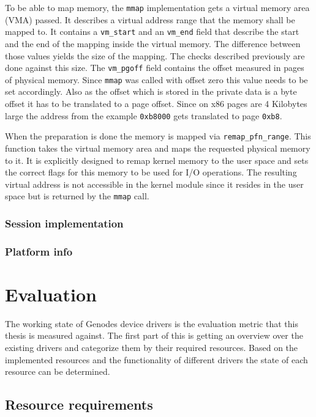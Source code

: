 \documentclass[
a4paper,
12pt,
notitlepage,
parskip=half,
DIV=11,
]{scrbook}
\begin{document}
		To be able to map memory, the \texttt{mmap} implementation gets a virtual memory area (VMA) passed.
		It describes a virtual address range that the memory shall be mapped to.
		It contains a \texttt{vm\_start} and an \texttt{vm\_end} field that describe the start and the end of the mapping inside the virtual memory.
		The difference between those values yields the size of the mapping.
		The checks described previously are done against this size.
		The \texttt{vm\_pgoff} field contains the offset measured in pages of physical memory.
		Since \texttt{mmap} was called with offset zero this value needs to be set accordingly.
		Also as the offset which is stored in the private data is a byte offset it has to be translated to a page offset.
		Since on x86 pages are 4 Kilobytes large the address from the example \texttt{0xb8000} gets translated to page \texttt{0xb8}.
		
		When the preparation is done the memory is mapped via \texttt{remap\_pfn\_range}.
		This function takes the virtual memory area and maps the requested physical memory to it.
		It is explicitly designed to remap kernel memory to the user space and sets the correct flags for this memory to be used for I/O operations.
		The resulting virtual address is not accessible in the kernel module since it resides in the user space but is returned by the \texttt{mmap} call.
		
		\subsection{Session implementation}
		
		\subsection{Platform info}
	
	\chapter{Evaluation}
	
		The working state of Genodes device drivers is the evaluation metric that this thesis is measured against.
		The first part of this is getting an overview over the existing drivers and categorize them by their required resources.
		Based on the implemented resources and the functionality of different drivers the state of each resource can be determined.
		
		\section{Resource requirements}
		
\end{document}
